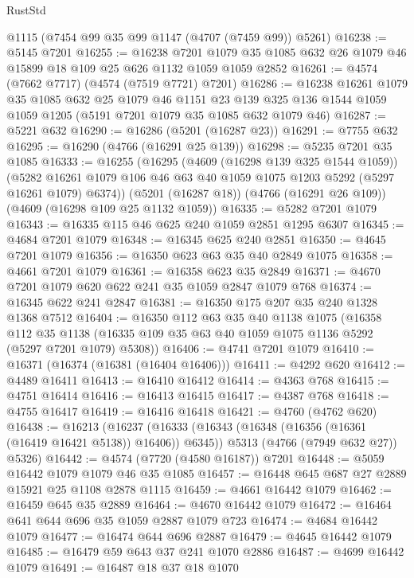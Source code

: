 \begin{lexlean}{RustStd}
\begin{coremodule}
    @1115
    (@7454 @99 @35 @99 @1147 (@4707 (@7459 @99)) @5261)
@16238 := @5145 @7201
@16255 := @16238
    @7201
    @1079
    @35
    @1085
    @632
    @26
    @1079
    @46
    @15899
    @18
    @109
    @25
    @626
    @1132
    @1059
    @1059
    @2852
@16261 := @4574 (@7662 @7717) (@4574 (@7519 @7721) @7201)
@16286 := @16238
    @16261
    @1079
    @35
    @1085
    @632
    @25
    @1079
    @46
    @1151
    @23
    @139
    @325
    @136
    @1544
    @1059
    @1059
    @1205
    (@5191 @7201 @1079 @35 @1085 @632 @1079 @46)
@16287 := @5221 @632
@16290 := @16286 (@5201 (@16287 @23))
@16291 := @7755 @632
@16295 := @16290 (@4766 (@16291 @25 @139))
@16298 := @5235 @7201 @35 @1085
@16333 := @16255
    (@16295
      (@4609 (@16298 @139 @325 @1544 @1059))
      (@5282 @16261 @1079 @106 @46 @63 @40 @1059 @1075 @1203 @5292 (@5297 @16261 @1079) @6374))
    (@5201 (@16287 @18))
    (@4766 (@16291 @26 @109))
    (@4609 (@16298 @109 @25 @1132 @1059))
@16335 := @5282 @7201 @1079
@16343 := @16335 @115 @46 @625 @240 @1059 @2851 @1295 @6307
@16345 := @4684 @7201 @1079
@16348 := @16345 @625 @240 @2851
@16350 := @4645 @7201 @1079
@16356 := @16350 @623 @63 @35 @40 @2849 @1075
@16358 := @4661 @7201 @1079
@16361 := @16358 @623 @35 @2849
@16371 := @4670 @7201 @1079 @620 @622 @241 @35 @1059 @2847 @1079 @768
@16374 := @16345 @622 @241 @2847
@16381 := @16350 @175 @207 @35 @240 @1328 @1368 @7512
@16404 := @16350
    @112
    @63
    @35
    @40
    @1138
    @1075
    (@16358
      @112
      @35
      @1138
      (@16335 @109 @35 @63 @40 @1059 @1075 @1136 @5292 (@5297 @7201 @1079) @5308))
@16406 := @4741 @7201 @1079
@16410 := @16371 (@16374 (@16381 (@16404 @16406)))
@16411 := @4292 @620
@16412 := @4489 @16411
@16413 := @16410 @16412
@16414 := @4363 @768
@16415 := @4751 @16414
@16416 := @16413 @16415
@16417 := @4387 @768
@16418 := @4755 @16417
@16419 := @16416 @16418
@16421 := @4760 (@4762 @620)
@16438 := @16213
    (@16237
      (@16333 (@16343 (@16348 (@16356 (@16361 (@16419 @16421 @5138)) @16406)) @6345))
      @5313
      (@4766 (@7949 @632 @27))
      @5326)
@16442 := @4574 (@7720 (@4580 @16187)) @7201
@16448 := @5059 @16442 @1079 @1079 @46 @35 @1085
@16457 := @16448 @645 @687 @27 @2889 @15921 @25 @1108 @2878 @1115
@16459 := @4661 @16442 @1079
@16462 := @16459 @645 @35 @2889
@16464 := @4670 @16442 @1079
@16472 := @16464 @641 @644 @696 @35 @1059 @2887 @1079 @723
@16474 := @4684 @16442 @1079
@16477 := @16474 @644 @696 @2887
@16479 := @4645 @16442 @1079
@16485 := @16479 @59 @643 @37 @241 @1070 @2886
@16487 := @4699 @16442 @1079
@16491 := @16487 @18 @37 @18 @1070

\end{coremodule}
\end{lexlean}
